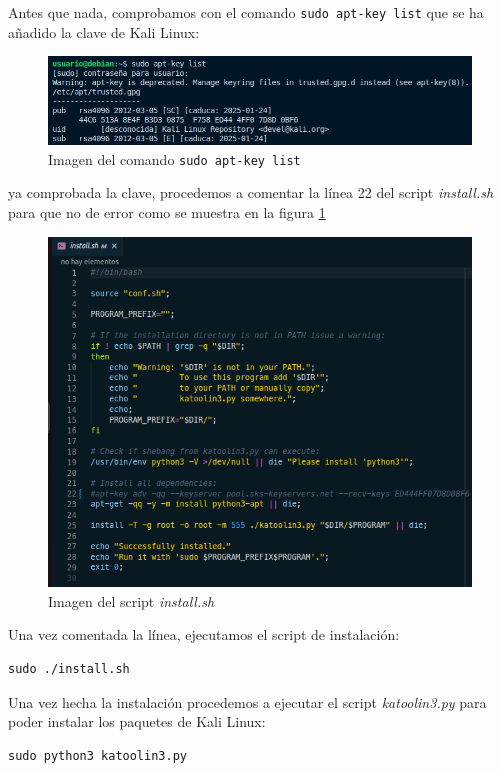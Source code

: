 \documentclass[11pt]{report}
\begin{document}
Antes que nada, comprobamos con el comando \texttt{sudo apt-key list} que se ha añadido la clave de Kali Linux:
\begin{figure}[H]
  \centering
  \includegraphics[scale=0.5]{img/apt-key_list.png}
  \caption{Imagen del comando \texttt{sudo apt-key list}}
\end{figure}

ya comprobada la clave, procedemos a comentar la línea 22 del script \emph{install.sh} para que no de error como se muestra en la figura \ref{fig:script}
\begin{figure}[H]
  \centering
  \includegraphics[scale=0.5]{img/comment_script.png}
  \caption{Imagen del script \emph{install.sh}}
  \label{fig:script}
\end{figure}

Una vez comentada la línea, ejecutamos el script de instalación:
\begin{verbatim}
sudo ./install.sh
\end{verbatim}

Una vez hecha la instalación procedemos a ejecutar el script \emph{katoolin3.py} para poder instalar los paquetes de Kali Linux:
\begin{verbatim}
sudo python3 katoolin3.py
\end{verbatim}
\end{document}
